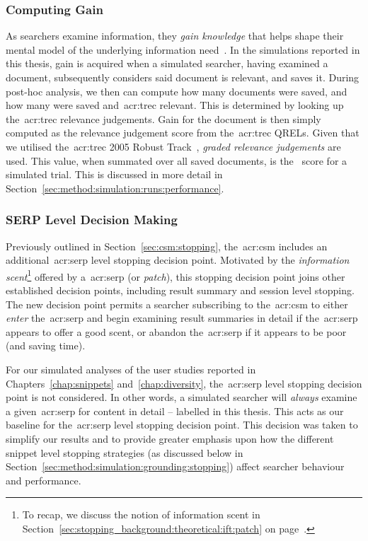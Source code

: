 \subsubsection{Computing Gain}\label{sec:method:simulation:grounding:gain}
As searchers examine information, they \emph{gain knowledge} that helps shape their mental model of the underlying information need~\citep{nickles1995judgment}. In the simulations reported in this thesis, gain is acquired when a simulated searcher, having examined a document, subsequently considers said document is relevant, and saves it. During post-hoc analysis, we then can compute how many documents were saved, and how many were saved and~\gls{acr:trec} relevant. This is determined by looking up the~\gls{acr:trec} relevance judgements. Gain for the document is then simply computed as the relevance judgement score from the~\gls{acr:trec} QRELs. Given that we utilised the~\gls{acr:trec} 2005 Robust Track~\citep{voorhees2005trec_book}, \emph{graded relevance judgements} are used. This value, when summated over all saved documents, is the~ score for a simulated trial. This is discussed in more detail in Section~\ref{sec:method:simulation:runs:performance}.

\vspace*{-2mm}
\subsubsection{SERP Level Decision Making}\label{sec:method:simulation:grounding:serp}
Previously outlined in Section~\ref{sec:csm:stopping}, the~\gls{acr:csm} includes an additional~\gls{acr:serp} level stopping decision point. Motivated by the \emph{information scent}\footnote{To recap, we discuss the notion of information scent in Section~\ref{sec:stopping_background:theoretical:ift:patch} on page~\pageref{sec:stopping_background:theoretical:ift:patch}.} offered by a~\gls{acr:serp} (or \emph{patch}), this stopping decision point joins other established decision points, including result summary and session level stopping. The new decision point permits a searcher subscribing to the~\gls{acr:csm} to either \emph{enter} the~\gls{acr:serp} and begin examining result summaries in detail if the~\gls{acr:serp} appears to offer a good scent, or abandon the~\gls{acr:serp} if it appears to be poor (and saving time).

For our simulated analyses of the user studies reported in Chapters~\ref{chap:snippets} and~\ref{chap:diversity}, the~\gls{acr:serp} level stopping decision point is not considered. In other words, a simulated searcher will \emph{always} examine a given~\gls{acr:serp} for content in detail -- labelled  in this thesis. This acts as our baseline for the~\gls{acr:serp} level stopping decision point. This decision was taken to simplify our results and to provide greater emphasis upon how the different snippet level stopping strategies (as discussed below in Section~\ref{sec:method:simulation:grounding:stopping}) affect searcher behaviour and performance.

